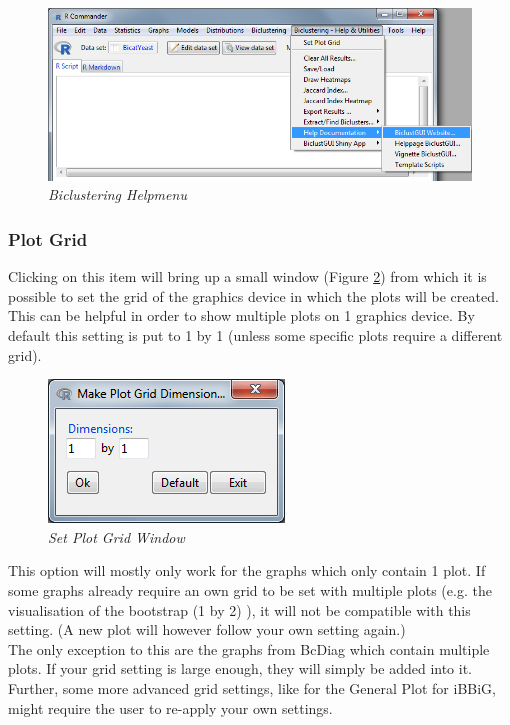 \documentclass[a4paper]{article}\usepackage[]{graphicx}\usepackage[]{color}
\begin{document}
\begin{figure}[H]
\centering
\includegraphics[scale=0.5]{figures/biclustering_helpmenu.png}
\caption{{\it Biclustering Helpmenu }\label{biclustering_helpmenu}}
\end{figure}

\subsubsection{Plot Grid}
\noindent Clicking on this item will bring up a small window (Figure
\ref{plotgridwindow}) from which it is possible to set the grid of the graphics
device in which the plots will be created. This can be helpful in order to show
multiple plots on 1 graphics device. By default this setting is put to 1 by 1
(unless some specific plots require a different grid).
\begin{figure}[H]
\centering
\includegraphics[scale=0.5]{figures/plotgridwindow.png}
\caption{{\it Set Plot Grid Window }\label{plotgridwindow}}
\end{figure}

 This option will mostly only work for the graphs which
only contain 1 plot. If some graphs already require an own grid to be set with
multiple plots (e.g. the visualisation of the bootstrap (1 by 2) ), it will not
be compatible with this setting. (A new plot will however follow your own
setting again.)\\
The only exception to this are the graphs from BcDiag which contain multiple
plots. If your grid setting is large enough, they will simply be added into it.
\\
Further, some more advanced grid settings, like for the General Plot for iBBiG,
might require the user to re-apply your own settings.
\end{document}
